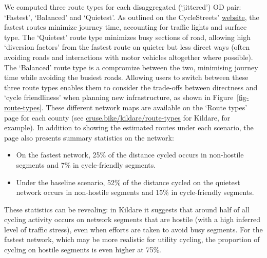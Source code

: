 \documentclass[
  super,
  preprint,
  3p]{elsarticle}
\begin{document}
We computed three route types for each disaggregated (`jittered') OD
pair: `Fastest', `Balanced' and `Quietest'. As outlined on the
CycleStreets'
\href{https://www.cyclestreets.net/help/journey/howitworks/}{website},
the fastest routes minimize journey time, accounting for traffic lights
and surface type. The `Quietest' route type minimizes busy sections of
road, allowing high `diversion factors' from the fastest route on
quieter but less direct ways (often avoiding roads and interactions with
motor vehicles altogether where possible). The `Balanced' route type is
a compromize between the two, minimising journey time while avoiding the
busiest roads. Allowing users to switch between these three route types
enables them to consider the trade-offs between directness and `cycle
friendliness' when planning new infrastructure, as shown in
Figure~\ref{fig-route-types}. These different network maps are available
on the `Route types' page for each county (see
\href{https://cruse.bike/kildare/route-types}{cruse.bike/kildare/route-types}
for Kildare, for example). In addition to showing the estimated routes
under each scenario, the page also presents summary statistics on the
network:

\begin{itemize}
\item
  On the fastest network, 25\% of the distance cycled occurs in
  non-hostile segments and 7\% in cycle-friendly segments.
\item
  Under the baseline scenario, 52\% of the distance cycled on the
  quietest network occurs in non-hostile segments and 15\% in
  cycle-friendly segments.
\end{itemize}

These statistics can be revealing: in Kildare it suggests that around
half of all cycling activity occurs on network segments that are hostile
(with a high inferred level of traffic stress), even when efforts are
taken to avoid busy segments. For the fastest network, which may be more
realistic for utility cycling, the proportion of cycling on hostile
segments is even higher at 75\%.
\end{document}
